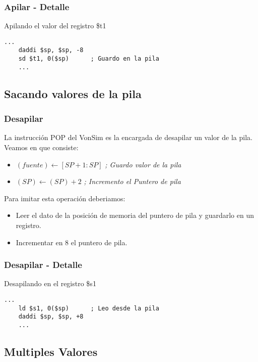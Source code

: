 \documentclass{beamer}
\begin{document}
\begin{frame}[fragile]
\frametitle{Apilar - Detalle}


\begin{block}{Apilando el valor del registro \$t1}
\begin{lstlisting}[basicstyle=\ttfamily,keywordstyle=\color{blue}]
    ...
    daddi $sp, $sp, -8
    sd $t1, 0($sp)      ; Guardo en la pila
    ...
\end{lstlisting}
\end{block}

\end{frame}



\subsection{Sacando valores de la pila}
\begin{frame}
\frametitle{Desapilar}
La instrucción POP del VonSim es la encargada de desapilar un valor de la pila. Veamos en que consiste:
\begin{itemize}
\item $(fuente) \xleftarrow{} [SP+1:SP]$ \emph{; Guardo valor de la pila}
\item $(SP) \xleftarrow{} (SP) + 2$ \emph{; Incremento el Puntero de pila}
\end{itemize}
Para imitar esta operación deberiamos:
\begin{itemize}
\item Leer el dato de la posición de memoria del puntero de pila y guardarlo en un registro.
\item Incrementar en 8 el puntero de pila.
\end{itemize}
\end{frame}

\begin{frame}[fragile]
\frametitle{Desapilar - Detalle}


\begin{block}{Desapilando en el registro \$s1}
\begin{lstlisting}[basicstyle=\ttfamily,keywordstyle=\color{blue}]
    ...
    ld $s1, 0($sp)      ; Leo desde la pila
    daddi $sp, $sp, +8
    ...
\end{lstlisting}
\end{block}

\end{frame}


\subsection{Multiples Valores}
\end{document}
